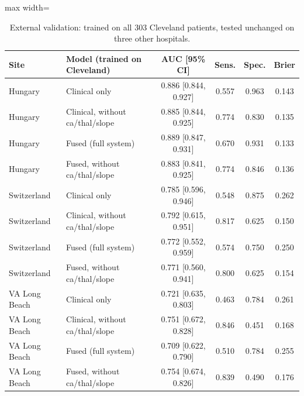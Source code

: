 \begin{table}[!t]
\centering
\scriptsize
\caption{External validation: trained on all 303 Cleveland patients, tested unchanged on three other hospitals.}
\label{tab:e7}
\setlength{\tabcolsep}{3pt}
\begin{adjustbox}{max width=\linewidth}
\begin{tabular}{llcccc}
\toprule
Site & Model (trained on Cleveland) & AUC [95\% CI] & Sens. & Spec. & Brier \\
\midrule
Hungary & Clinical only & 0.886 [0.844, 0.927] & 0.557 & 0.963 & 0.143 \\
Hungary & Clinical, without ca/thal/slope & 0.885 [0.844, 0.925] & 0.774 & 0.830 & 0.135 \\
Hungary & Fused (full system) & 0.889 [0.847, 0.931] & 0.670 & 0.931 & 0.133 \\
Hungary & Fused, without ca/thal/slope & 0.883 [0.841, 0.925] & 0.774 & 0.846 & 0.136 \\
Switzerland & Clinical only & 0.785 [0.596, 0.946] & 0.548 & 0.875 & 0.262 \\
Switzerland & Clinical, without ca/thal/slope & 0.792 [0.615, 0.951] & 0.817 & 0.625 & 0.150 \\
Switzerland & Fused (full system) & 0.772 [0.552, 0.959] & 0.574 & 0.750 & 0.250 \\
Switzerland & Fused, without ca/thal/slope & 0.771 [0.560, 0.941] & 0.800 & 0.625 & 0.154 \\
VA Long Beach & Clinical only & 0.721 [0.635, 0.803] & 0.463 & 0.784 & 0.261 \\
VA Long Beach & Clinical, without ca/thal/slope & 0.751 [0.672, 0.828] & 0.846 & 0.451 & 0.168 \\
VA Long Beach & Fused (full system) & 0.709 [0.622, 0.790] & 0.510 & 0.784 & 0.255 \\
VA Long Beach & Fused, without ca/thal/slope & 0.754 [0.674, 0.826] & 0.839 & 0.490 & 0.176 \\
\bottomrule
\end{tabular}
\end{adjustbox}
\end{table}

